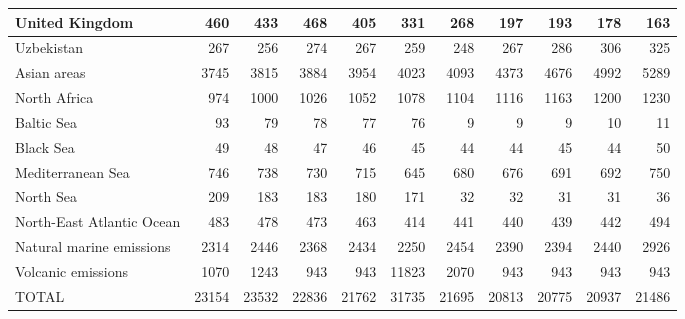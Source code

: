 \begin{table}
\begin{tabular}{|l|r|r|r|r|r|r|r|r|r|r|}
                United Kingdom&    460&    433&    468&    405&    331&    268&    197&    193&    178&    163\\\hline
                    Uzbekistan&    267&    256&    274&    267&    259&    248&    267&    286&    306&    325\\\hline
                   Asian areas&   3745&   3815&   3884&   3954&   4023&   4093&   4373&   4676&   4992&   5289\\\hline
                  North Africa&    974&   1000&   1026&   1052&   1078&   1104&   1116&   1163&   1200&   1230\\\hline
                    Baltic Sea&     93&     79&     78&     77&     76&      9&      9&      9&     10&     11\\\hline
                     Black Sea&     49&     48&     47&     46&     45&     44&     44&     45&     44&     50\\\hline
             Mediterranean Sea&    746&    738&    730&    715&    645&    680&    676&    691&    692&    750\\\hline
                     North Sea&    209&    183&    183&    180&    171&     32&     32&     31&     31&     36\\\hline
     North-East Atlantic Ocean&    483&    478&    473&    463&    414&    441&    440&    439&    442&    494\\\hline
      Natural marine emissions&   2314&   2446&   2368&   2434&   2250&   2454&   2390&   2394&   2440&   2926\\\hline
            Volcanic emissions&   1070&   1243&    943&    943&  11823&   2070&    943&    943&    943&    943\\\hline\hline
                         TOTAL&  23154&  23532&  22836&  21762&  31735&  21695&  20813&  20775&  20937&  21486\\\hline
 \end{tabular}
 \end{table}
 
